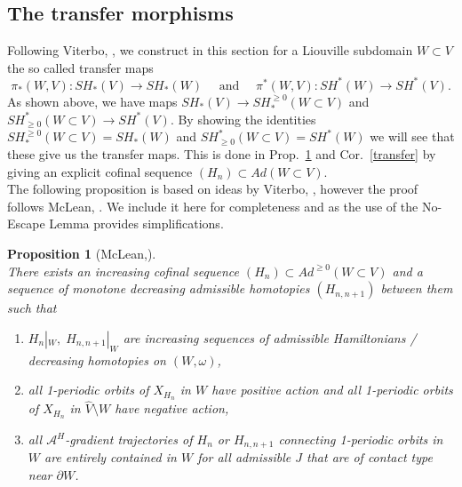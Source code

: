 \documentclass[a4paper,12pt,bibliography=totocnumbered,titlepage=false,abstracton,bookmarksnumbered=true]{scrartcl}
\newtheorem{prop}[defn]{Proposition}
\theoremstyle{definition}
\begin{document}
\subsection{The transfer morphisms}\label{sectransfer}
Following Viterbo, \cite{Vit}, we construct in this section for a Liouville subdomain $W\subset V$ the so called transfer maps \[\pi_\ast(W,V):SH_\ast(V)\rightarrow SH_\ast(W) \quad\text{ and }\quad \pi^\ast(W,V):SH^\ast(W)\rightarrow SH^\ast(V).\]
As shown above, we have maps $SH_\ast(V)\rightarrow  SH_\ast^{\geq0}(W{\subset}V)$ and $SH^\ast_{\geq0}(W{\subset}V)\rightarrow SH^\ast(V)$. By showing the identities $SH_\ast^{\geq0}(W{\subset}V)= SH_\ast(W)$ and $SH^\ast_{\geq0}(W{\subset}V)= SH^\ast(W)$ we will see that these give us the transfer maps. This is done in Prop.\ \ref{proptrans} and Cor.\ \ref{transfer} by giving an explicit cofinal sequence $(H_n)\subset Ad(W{\subset}V)$.\\
The following proposition is based on ideas by Viterbo, \cite{Vit}, however the proof follows McLean, \cite{McLeanDis}. We include it here for completeness and as the use of the No-Escape Lemma provides simplifications.
\begin{prop}[McLean,\cite{McLeanDis}]\label{proptrans}~\\
 There exists an increasing cofinal sequence $(H_n)\subset Ad^{\geq0}(W{\subset}V)$ and a sequence of monotone decreasing admissible homotopies $(H_{n,n+1})$ between them such that
 \begin{enumerate}
  \item $H_n|_W, \; H_{n,n+1}|_W$ are increasing sequences of admissible Hamiltonians / decreasing homotopies on $(W,\omega)$,
  \item all 1-periodic orbits of $X_{H_n}$ in $W$ have positive action and all 1-periodic orbits of $X_{H_n}$ in $\widehat{V}\setminus W$ have negative action,
  \item all $\mathcal{A}^H$-gradient trajectories of $H_n$ or $H_{n,n+1}$ connecting 1-periodic orbits in $W$ are entirely contained in $W$ for all admissible $J$ that are of contact type near $\partial W$.
 \end{enumerate}
\end{prop}
\end{document}
